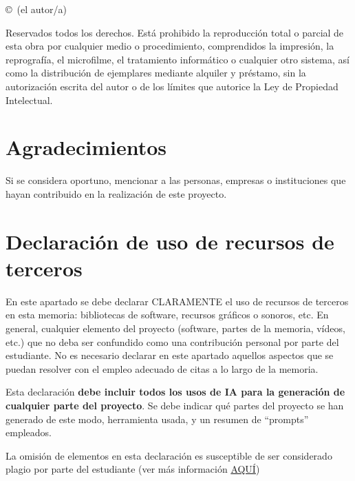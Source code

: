 \documentclass{uoc_memoria}
\begin{document}
\noindent
\textbf{}\par
\vspace{2mm}
\begin{guidancebox}
\copyright\ (el autor/a)

Reservados todos los derechos. Está prohibido la reproducción total o parcial de esta obra por cualquier medio o procedimiento, comprendidos la impresión, la reprografía, el microfilme, el tratamiento informático o cualquier otro sistema, así como la distribución de ejemplares mediante alquiler y préstamo, sin la autorización escrita del autor o de los límites que autorice la Ley de Propiedad Intelectual.
\end{guidancebox}

\clearpage
{}
\setcounter{page}{1}
\pagestyle{uocdefault}

\makefichaproyecto

\clearpage
\section*{Agradecimientos}

\begin{guidancebox}
Si se considera oportuno, mencionar a las personas, empresas o instituciones que hayan contribuido en la realización de este proyecto.
\end{guidancebox}

\clearpage
\section*{Declaración de uso de recursos de terceros}

\begin{guidancebox}
En este apartado se debe declarar CLARAMENTE el uso de recursos de terceros en esta memoria: bibliotecas de software, recursos gráficos o sonoros, etc. En general, cualquier elemento del proyecto (software, partes de la memoria, vídeos, etc.) que no deba ser confundido como una contribución personal por parte del estudiante. No es necesario declarar en este apartado aquellos aspectos que se puedan resolver con el empleo adecuado de citas a lo largo de la memoria.

Esta declaración \textbf{debe incluir todos los usos de IA para la generación de cualquier parte del proyecto}. Se debe indicar qué partes del proyecto se han generado de este modo, herramienta usada, y un resumen de ``prompts'' empleados.

La omisión de elementos en esta declaración es susceptible de ser considerado plagio por parte del estudiante (ver más información \href{https://campus.uoc.edu/estudiant/microsites/plagi/es/index.html}{AQUÍ})
\end{guidancebox}
\end{document}
